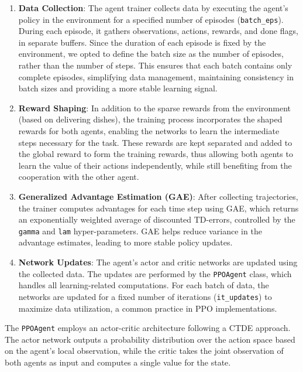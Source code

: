 \documentclass{article}
\begin{document}
\begin{enumerate}
  \item \textbf{Data Collection}: The agent trainer collects data by executing the agent's policy in the environment for a specified number of episodes (\texttt{batch\_eps}). During each episode, it gathers observations, actions, rewards, and done flags, in separate buffers. Since the duration of each episode is fixed by the environment, we opted to define the batch size as the number of episodes,  rather than the number of steps. This ensures that each batch contains only complete episodes, simplifying data management, maintaining consistency in batch sizes and providing a more stable learning signal.

  \item \textbf{Reward Shaping}: In addition to the sparse rewards from the environment (based on delivering dishes), the training process incorporates the shaped rewards for both agents, enabling the networks to learn the intermediate steps necessary for the task. These rewards are kept separated and added to the global reward to form the training rewards, thus allowing both agents to learn the value of their actions independently, while still benefiting from the cooperation with the other agent.

  \item \textbf{Generalized Advantage Estimation (GAE)}: After collecting trajectories, the trainer computes advantages for each time step using GAE, which returns an exponentially weighted average of discounted TD-errors, controlled by the \texttt{gamma} and \texttt{lam} hyper-parameters. GAE helps reduce variance in the advantage estimates, leading to more stable policy updates.
  
  \item \textbf{Network Updates}: The agent's actor and critic networks are updated using the collected data. The updates are performed by the \texttt{PPOAgent} class, which handles all learning-related computations. For each batch of data, the networks are updated for a fixed number of iterations (\texttt{it\_updates}) to maximize data utilization, a common practice in PPO implementations.
\end{enumerate}

The \texttt{PPOAgent} employs an actor-critic architecture following a CTDE approach. The actor network outputs a probability distribution over the action space based on the agent's local observation, while the critic takes the joint observation of both agents as input and computes a single value for the state. 
\end{document}
